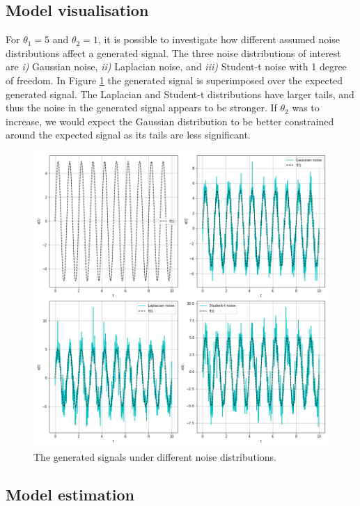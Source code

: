 \documentclass{article}
\begin{document}
\subsection{Model visualisation}

For $\theta_1 = 5$ and $\theta_2 = 1$, it is possible to investigate how different assumed noise distributions affect a generated signal. The three noise distributions of interest are \emph{i)} Gaussian noise, \emph{ii)} Laplacian noise, and \emph{iii)} Student-t noise with 1 degree of freedom. In Figure \ref{fig:Q3a_1} the generated signal is superimposed over the expected generated signal. The Laplacian and Student-t distributions have larger tails, and thus the noise in the generated signal appears to be stronger. If $\theta_2$ was to increase, we would expect the Gaussian distribution to be better constrained around the expected signal as its tails are less significant.
\begin{figure}[!htb]
    \centering
    \includegraphics[scale = 0.4]{Q3a_fig1.png}
    \caption{The generated signals under different noise distributions.}
    \label{fig:Q3a_1}
\end{figure}

\subsection{Model estimation}
\end{document}

